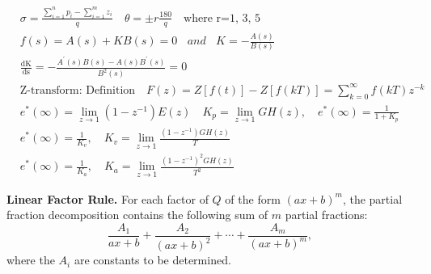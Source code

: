 \begin{multicols}{2}
\begin{align*}
& \sigma  = {\frac{\sum\limits_{i = 1}^n {{p_i}}  - \sum\limits_{i = 1}^m {{z_i}} }{q}} \quad \theta = \pm r{\frac{180}{q}} \quad \text{where r=1, 3, 5} \\
& f\left( s \right) = A\left( s \right) + KB\left( s \right) = 0\ \ \ \ and\ \ \ \ K = - \frac{A\left( s \right)}{B\left( s \right)} \\
& \frac{\text{dK}}{\text{ds}} = - \frac{A^{'}\left( s \right)B\left( s \right) - A\left( s \right)B^{'}\left( s \right)}{B^{2}\left( s \right)} = 0 \\
%
%
%
%
%
%
& \text{Z-transform: Definition} \quad F(z)=Z[f(t)]-Z[f(kT)]=\sum_{k=0}^{\infty}f(kT)z^{-k} \\
& e^\ast(\infty)=\lim_{z \rightarrow 1} (1-z^{-1})E(z) \quad K_p=\lim_{z \rightarrow 1} GH(z), \quad e^\ast (\infty) = \frac{1}{1+K_p} \\
& e^\ast(\infty) = \frac{1}{K_v}, \quad K_v =  \lim_{z \rightarrow 1} \frac{(1-z^{-1}) GH(z)}{T}  \\
& e^\ast(\infty) = \frac{1}{K_a}, \quad K_a =  \lim_{z \rightarrow 1}\frac{(1-z^{-1})^2 GH(z)}{T^2}
\end{align*}

{\bf Linear Factor Rule.}  
 For each factor of $Q$ of the form $(ax+b)^m$, 
 the partial fraction decomposition contains 
 the following sum of $m$ partial fractions:  
\[
\frac{A_1}{ax+b} + \frac{A_2}{(ax+b)^2} + \cdots + \frac{A_m}{(ax+b)^m},
\]
 where the $A_i$ are constants to be determined.  


\end{multicols}
